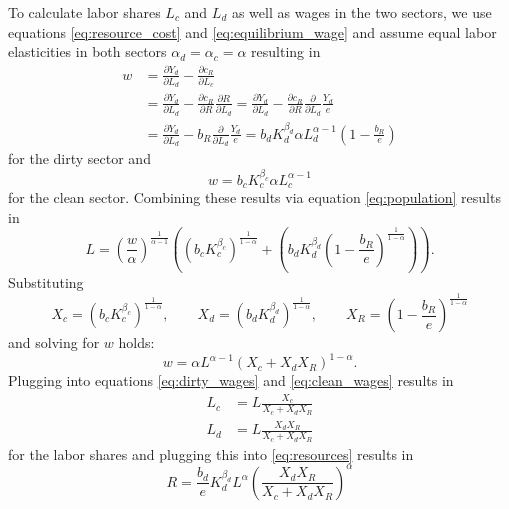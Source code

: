 To calculate labor shares $L_c$ and $L_d$ as well as wages in the two sectors, we use equations \eqref{eq:resource_cost} and \eqref{eq:equilibrium_wage} and assume equal labor elasticities in both sectors $\alpha_d = \alpha_c = \alpha$ resulting in
\begin{align}
	w &= \frac{\partial Y_d}{\partial L_d} - \frac{\partial c_R}{\partial L_c} \nonumber \\
	&= \frac{\partial Y_d}{\partial L_d} - \frac{\partial c_R}{\partial R} \frac{\partial R}{\partial L_d} \nonumber = \frac{\partial Y_d}{\partial L_d} - \frac{\partial c_R}{\partial R} \frac{\partial}{\partial L_d} \frac{Y_d}{e} \nonumber \\
	&= \frac{\partial Y_d}{\partial L_d} - b_R \frac{\partial}{\partial L_d} \frac{Y_d}{e} = b_d K_d^{\beta_d} \alpha L_d^{\alpha-1}\left( 1-\frac{b_R}{e} \right)
	\label{eq:dirty_wages}
\end{align}
for the dirty sector and
\begin{equation}
	w = b_c K_c^{\beta_c} \alpha L_c^{\alpha-1}
	\label{eq:clean_wages}
\end{equation}
for the clean sector. Combining these results via equation \eqref{eq:population} results in
\begin{equation}
	L = \left( \frac{w}{\alpha} \right)^{\frac{1}{\alpha-1}}\left( \left( b_c K_c^{\beta_c} \right)^{\frac{1}{1-\alpha}} + \left( b_d K_d^{\beta_d} \left( 1 - \frac{b_R}{e} \right)^{\frac{1}{1-\alpha}} \right) \right).
\end{equation}
Substituting 
\begin{equation}
	X_c = (b_c K_c^{\beta_c})^{\frac{1}{1-\alpha}}, \qquad X_d = (b_d K_d^{\beta_d})^{\frac{1}{1-\alpha}}, \qquad X_R = \left( 1 - \frac{b_R}{e} \right)^{\frac{1}{1-\alpha}}
	\label{eq:substitutions}
\end{equation}
and solving for $w$ holds:
\begin{equation}
	w = \alpha L^{\alpha-1}\left( X_c + X_d X_R \right)^{1-\alpha}.
	\label{eq:wage_result}
\end{equation}
Plugging into equations \eqref{eq:dirty_wages} and \eqref{eq:clean_wages} results in 
\begin{align}
	L_c &= L \frac{X_c}{X_c + X_d X_R} \label{eq:clean_labor} \\
	L_d &= L \frac{X_d X_R}{X_c + X_d X_R} \label{eq:dirty_labor}
\end{align}
for the labor shares and plugging this into \eqref{eq:resources} results in
\begin{equation}
	R = \frac{b_d}{e}K_d^{\beta_d}L^{\alpha}\left( \frac{X_d X_R}{X_c + X_d X_R} \right)^{\alpha}
	\label{eq:R_result}
\end{equation}
